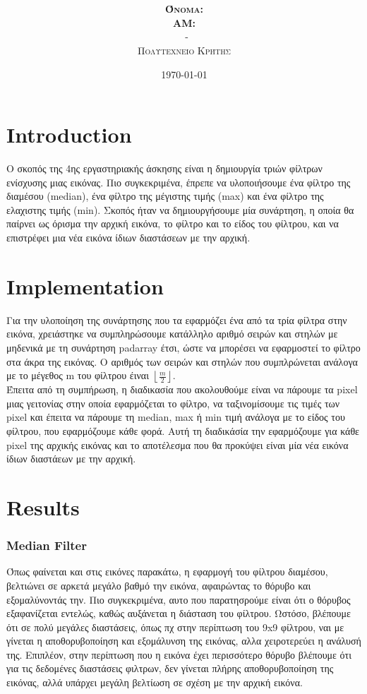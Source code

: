 \documentclass{article}
\title{\underline{\textbf{\assignmentNumber}}}
\author{\textsc{\textbf{Όνομα:}}  \studentName\\
		\textsc{\textbf{ΑΜ:}}  \studentNumber\\
		\course \ - \courseName\\ 
		\textsc{Πολυτεχνείο Κρήτης}
}
\date{\today}
\begin{document}
	\maketitle

\section*{Introduction}
	Ο σκοπός της 4ης εργαστηριακής άσκησης είναι η δημιουργία τριών φίλτρων ενίσχυσης μιας εικόνας. Πιο συγκεκριμένα, έπρεπε να υλοποιήσουμε ένα φίλτρο της διαμέσου (median), ένα φίλτρο της μέγιστης τιμής (max) και ένα φίλτρο της ελαχιστης τιμής (min). Σκοπός ήταν να δημιουργήσουμε μία συνάρτηση, η οποία θα παίρνει ως όρισμα την αρχική εικόνα, το φίλτρο και το είδος του φίλτρου, και να επιστρέφει μια νέα εικόνα ίδιων διαστάσεων με την αρχική. 

\section*{Implementation}
	Για την υλοποίηση της συνάρτησης που τα εφαρμόζει ένα από τα τρία φίλτρα στην εικόνα, χρειάστηκε να συμπληρώσουμε κατάλληλο αριθμό σειρών και στηλών με μηδενικά με τη συνάρτηση padarray έτσι, ώστε να μπορέσει να εφαρμοστεί το φίλτρο στα άκρα της εικόνας. Ο αριθμός των σειρών και στηλών που συμπλρώνεται ανάλογα με το μέγεθος m του φίλτρου έιναι $\left \lfloor \frac{m}{2} \right \rfloor  $. \\
	
	\noindent
	Έπειτα από τη συμπήρωση, η διαδικασία που ακολουθούμε είναι να πάρουμε τα pixel μιας γειτονίας στην οποία εφαρμόζεται το φίλτρο, να ταξινομίσουμε τις τιμές των pixel και έπειτα να πάρουμε τη median, max ή min τιμή ανάλογα με το είδος του φίλτρου, που εφαρμόζουμε κάθε φορά. Αυτή τη διαδικάσία την εφαρμόζουμε για κάθε pixel της αρχικής εικόνας και το αποτέλεσμα που θα προκύψει είναι μία νέα εικόνα ίδιων διαστάεων με την αρχική.
	
\section*{Results}
	\subsubsection*{Median Filter}
	
	\noindent
	Όπως φαίνεται και στις εικόνες παρακάτω, η εφαρμογή του φίλτρου διαμέσου, βελτιώνει σε αρκετά μεγάλο βαθμό την εικόνα, αφαιρώντας το θόρυβο και εξομαλύνοντάς την. Πιο συγκεκριμένα, αυτο που παρατησρούμε είναι ότι ο θόρυβος εξαφανίζεται εντελώς,  καθώς αυξάνεται η διάσταση του φίλτρου. Ωστόσο, βλέπουμε ότι σε πολύ μεγάλες διαστάσεις, όπως πχ στην περίπτωση του 9x9 φίλτρου, ναι με γίνεται η αποθορυβοποίηση και εξομάλυνση της εικόνας, αλλα χειροτερεύει η ανάλυσή της. Επιπλέον, στην περίπτωση που η εικόνα έχει περισσότερο θόρυβο βλέπουμε ότι για τις δεδομένες διαστάσεις φιλτρων, δεν γίνεται πλήρης αποθορυβοποίηση της εικόνας, αλλά υπάρχει μεγάλη βελτίωση σε σχέση με την αρχική εικόνα.
	
\end{document}

